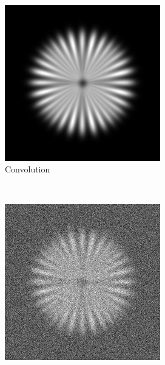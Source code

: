 \documentclass{./packages/optica-article}
\begin{document}
\begin{figure}[hbp]
	\begin{center}
		\,\hfill
		\begin{subfigure}[t]{0.25\textwidth}\centering
			\centering
			\includegraphics[width=\textwidth]{Simulation deconvolution/ref_conv}
			\caption{Convolution}\label{fig:sim:conv}
		\end{subfigure}
		\,\hfill
		\begin{subfigure}[t]{0.25\textwidth}\centering
			\centering
			\includegraphics[width=\textwidth]{Simulation deconvolution/ref_ng_0.1}

\end{subfigure}
\end{center}
\end{figure}
\end{document}
